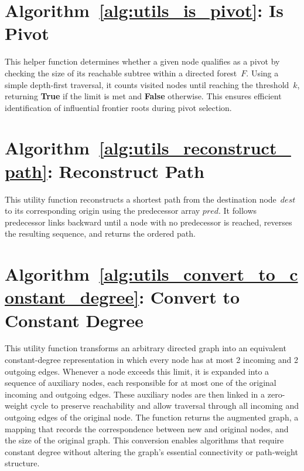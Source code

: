 \documentclass[ijoc,blindrev]{informs3} %
\begin{document}
\begin{APPENDICES}
\section{Algorithm~\ref{alg:utils_is_pivot}: Is Pivot}
\label{app:is_pivot}
This helper function determines whether a given node qualifies as a pivot by checking the size of its reachable subtree within a directed forest~$F$. 
Using a simple depth-first traversal, it counts visited nodes until reaching the threshold~$k$, returning \textbf{True} if the limit is met and \textbf{False} otherwise. 
This ensures efficient identification of influential frontier roots during pivot selection.


\section{Algorithm~\ref{alg:utils_reconstruct_path}: Reconstruct Path}
\label{app:path}

This utility function reconstructs a shortest path from the destination
node~$dest$ to its corresponding origin using the predecessor array
$\textit{pred}$. It follows predecessor links backward until a node with
no predecessor is reached, reverses the resulting sequence, and returns
the ordered path.


\section{Algorithm~\ref{alg:utils_convert_to_constant_degree}: Convert to Constant Degree}
\label{app:to_out_degree}

This utility function transforms an arbitrary directed graph into an equivalent constant-degree representation in which every node has at most 2 incoming and 2 outgoing edges.
Whenever a node exceeds this limit, it is expanded into a sequence of auxiliary nodes, each responsible for at most one of the original incoming and outgoing edges.
These auxiliary nodes are then linked in a zero-weight cycle to preserve reachability and allow traversal through all incoming and outgoing edges of the original node.
The function returns the augmented graph, a mapping that records the correspondence between new and original nodes, and the size of the original graph.
This conversion enables algorithms that require constant degree without altering the graph’s essential connectivity or path-weight structure.



\end{APPENDICES}
\end{document}

